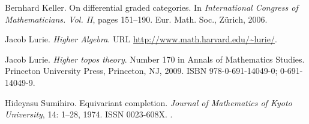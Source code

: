 \documentclass{oupau}
\theoremstyle{remark}
\begin{document}
\begin{thebibliography}{20}
Bernhard Keller.
\newblock On differential graded categories.
\newblock In \emph{International {C}ongress of {M}athematicians. {V}ol. {II}},
  pages 151--190. Eur. Math. Soc., Zürich, 2006.

Jacob Lurie.
\newblock \emph{Higher Algebra}.
\newblock URL \url{http://www.math.harvard.edu/~lurie/}.

Jacob Lurie.
\newblock \emph{Higher topos theory}.
\newblock Number 170 in Annals of Mathematics Studies. Princeton University
  Press, Princeton, NJ, 2009.
\newblock ISBN 978-0-691-14049-0; 0-691-14049-9.

Hideyasu Sumihiro.
\newblock Equivariant completion.
\newblock \emph{Journal of Mathematics of Kyoto University}, 14:
  1--28, 1974.
\newblock ISSN 0023-608X.
\newblock {}.

\end{thebibliography}
\end{document}
